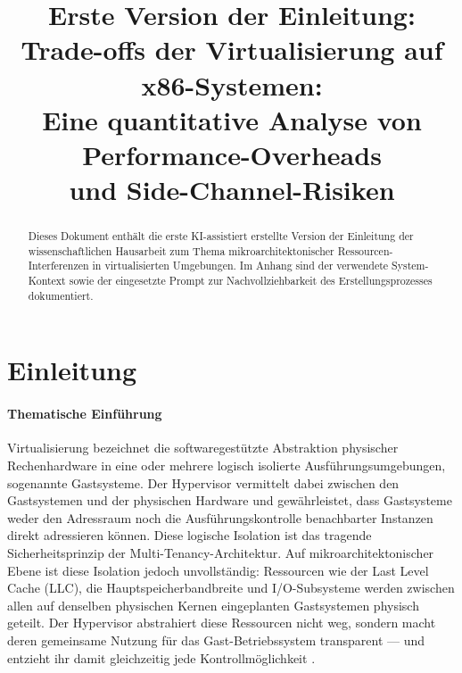 \documentclass[conference]{IEEEtran}
\begin{document}
\title{Erste Version der Einleitung:\\
Trade-offs der Virtualisierung auf x86-Systemen:\\
Eine quantitative Analyse von Performance-Overheads\\
und Side-Channel-Risiken}

\author{%
}

\maketitle

\begin{abstract}
Dieses Dokument enthält die erste KI-assistiert erstellte Version der
Einleitung der wissenschaftlichen Hausarbeit zum Thema
mikroarchitektonischer Ressourcen-Interferenzen in virtualisierten
Umgebungen. Im Anhang sind der verwendete System-Kontext sowie der
eingesetzte Prompt zur Nachvollziehbarkeit des Erstellungsprozesses
dokumentiert.
\end{abstract}

\section{Einleitung}

\paragraph{Thematische Einführung}
Virtualisierung bezeichnet die softwaregestützte Abstraktion physischer
Rechenhardware in eine oder mehrere logisch isolierte
Ausführungsumgebungen, sogenannte Gastsysteme. Der Hypervisor vermittelt
dabei zwischen den Gastsystemen und der physischen Hardware und
gewährleistet, dass Gastsysteme weder den Adressraum noch die
Ausführungskontrolle benachbarter Instanzen direkt adressieren können.
Diese logische Isolation ist das tragende Sicherheitsprinzip der
Multi-Tenancy-Architektur. Auf mikroarchitektonischer Ebene ist diese
Isolation jedoch unvollständig: Ressourcen wie der Last Level Cache
(LLC), die Hauptspeicherbandbreite und I/O-Subsysteme werden zwischen
allen auf denselben physischen Kernen eingeplanten Gastsystemen physisch
geteilt. Der Hypervisor abstrahiert diese Ressourcen nicht weg, sondern
macht deren gemeinsame Nutzung für das Gast-Betriebssystem transparent
--- und entzieht ihr damit gleichzeitig jede Kontrollmöglichkeit
\cite{koh2007analysis}.
\end{document}
